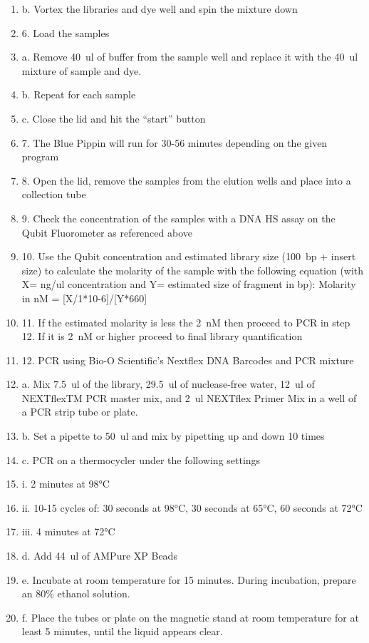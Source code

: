 \documentclass[graybox]{svmult}
\begin{document}
\begin{enumerate}
\item{b.      Vortex the libraries and dye well and spin the mixture down}
\item{6.      Load the samples}
\item{a.      Remove 40~ul of buffer from the sample well and replace it with the 40~ul mixture of sample and dye.}
\item{b.      Repeat for each sample}
\item{c.      Close the lid and hit the “start” button}
\item{7.      The Blue Pippin will run for 30-56 minutes depending on the given program}
\item{8.      Open the lid, remove the samples from the elution wells and place into a collection tube}
\item{9.      Check the concentration of the samples with a DNA HS assay on the Qubit Fluorometer as referenced above}
\item{10.      Use the Qubit concentration and estimated library size (100~bp + insert size) to calculate the molarity of the sample with the following equation (with X= ng/ul concentration and Y= estimated size of fragment in bp): Molarity in nM = [X/1*10-6]/[Y*660]}
\item{11.     If the estimated molarity is less the 2~nM then proceed to PCR in step 12. If it is 2~nM or higher proceed to final library quantification}
\item{12.     PCR using Bio-O Scientific’s Nextflex DNA Barcodes and PCR mixture}
\item{a.      Mix 7.5~ul of the library, 29.5~ul of nuclease-free water, 12~ul of NEXTflexTM PCR master mix, and 2~ul NEXTflex Primer Mix in a well of a PCR strip tube or plate.}
\item{b.      Set a pipette to 50~ul and mix by pipetting up and down 10 times}
\item{c.      PCR on a thermocycler under the following settings}
\item{i.      2 minutes at 98°C}
\item{ii.     10-15 cycles of: 30 seconds at 98°C, 30 seconds at 65°C, 60 seconds at 72°C}
\item{iii.    4 minutes at 72°C}
\item{d.      Add 44~ul of AMPure XP Beads}
\item{e.      Incubate at room temperature for 15 minutes. During incubation, prepare an 80\% ethanol solution.}
\item{f.      Place the tubes or plate on the magnetic stand at room temperature for at least 5 minutes, until the liquid appears clear.}

\end{enumerate}
\end{document}

